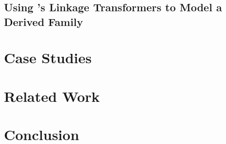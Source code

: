 
\subsection{Using \TT's Linkage Transformers to Model a Derived Family}
\label{sec:lt-in-action}


\newpage
\section{Case Studies}
\label{sec:casestudies}

\newpage
\section{Related Work}\label{sec:related-work}

\newpage
\section{Conclusion}
\label{sec:conclusion}







\newpage

